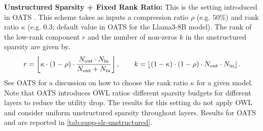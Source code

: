 \textbf{Unstructured Sparsity + Fixed Rank Ratio:} This is the setting introduced in OATS \cite{zhang2024oats}. This scheme takes as inputs a compression ratio $\rho$ (e.g. $50\%$) and rank ratio $\kappa$ (e.g. $0.3$; default value in OATS for the Llama3-8B model). The rank of the low-rank component $r$ and the number of non-zeros $k$ in the unstructured sparsity are given by.
\begin{equation*}
    r = \left\lfloor \kappa \cdot (1 - \rho) \cdot \frac{N_{\text{out}} \cdot N_{\text{in}}}{N_{\text{out}} + N_{\text{in}}} \right\rfloor, \quad \quad k = \left\lfloor (1 - \kappa) \cdot (1 - \rho) \cdot N_{\text{out}} \cdot N_{\text{in}} \right\rfloor.
\end{equation*}
See OATS for a discussion on how to choose the rank ratio $\kappa$ for a given model. Note that OATS introduces OWL ratios--different sparsity budgets for different layers to reduce the utility drop. The results for this setting do not apply OWL and consider uniform unstructured sparsity throughout layers. Results for OATS and \ourframework are reported in \cref{tab:supp-slr-unstructured}.




